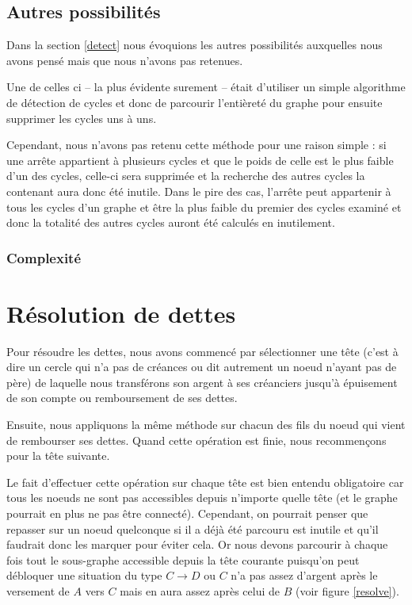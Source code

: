 \documentclass[12pt, oneside]{article}
\begin{document}
\subsection{Autres possibilités}
\label{others}

Dans la section \ref{detect} nous évoquions les autres possibilités auxquelles nous avons pensé mais que nous n'avons pas retenues. 

Une de celles ci -- la plus évidente surement -- était d'utiliser un simple algorithme de détection de cycles et donc de parcourir l'entièreté du graphe pour ensuite supprimer les cycles uns à uns.

Cependant, nous n'avons pas retenu cette méthode pour une raison simple : si une arrête appartient à plusieurs cycles et que le poids de celle est le plus faible d'un des cycles, celle-ci sera supprimée et la recherche des autres cycles la contenant aura donc été inutile. Dans le pire des cas, l'arrête peut appartenir à tous les cycles d'un graphe et être la plus faible du premier des cycles examiné et donc la totalité des autres cycles auront été calculés en inutilement.


\subsubsection{Complexité}


\section{Résolution de dettes}
Pour résoudre les dettes, nous avons commencé par sélectionner une tête (c'est à dire un cercle qui n'a pas de créances ou dit autrement un noeud n'ayant pas de père) de laquelle nous transférons son argent à ses créanciers jusqu'à épuisement de son compte ou remboursement de ses dettes.

Ensuite, nous appliquons la même méthode sur chacun des fils du noeud qui vient de rembourser ses dettes.
Quand cette opération est finie, nous recommençons pour la tête suivante.

Le fait d'effectuer cette opération sur chaque tête est bien entendu obligatoire car tous les noeuds ne sont pas accessibles depuis n'importe quelle tête (et le graphe pourrait en plus ne pas être connecté). Cependant, on pourrait penser que repasser sur un noeud quelconque si il a déjà été parcouru est inutile et qu'il faudrait donc les marquer pour éviter cela. Or nous devons parcourir à chaque fois tout le sous-graphe accessible depuis la tête courante puisqu'on peut débloquer une situation du type $C \rightarrow D$ ou $C$ n'a pas assez d'argent après le versement de $A$ vers $C$ mais en aura assez après celui de $B$ (voir figure \ref{resolve}).
\end{document}
